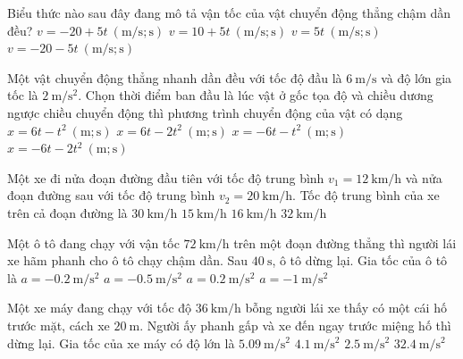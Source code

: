 \begin{ex}
	Biểu thức nào sau đây đang mô tả vận tốc của vật chuyển động thẳng chậm dần đều?
	\choice
	{\True $v=-20+5t\ \left(\si{\meter/\second}; \si{\second}\right)$}
	{$v=10+5t\ \left(\si{\meter/\second}; \si{\second}\right)$}
	{$v=5t\ \left(\si{\meter/\second}; \si{\second}\right)$}
	{$v=-20-5t\ \left(\si{\meter/\second}; \si{\second}\right)$}
	\loigiai{}
\end{ex}
\begin{ex}
	Một vật chuyển động thẳng nhanh dần đều với tốc độ đầu là $\SI{6}{\meter/\second}$ và độ lớn gia tốc là $\SI{2}{\meter/\second^2}$. Chọn thời điểm ban đầu là lúc vật ở gốc tọa độ và chiều dương ngược chiều chuyển động thì phương trình chuyển động của vật có dạng
	\choice
	{$x=6t-t^2\ \left(\si{\meter}; \si{\second}\right)$}
	{$x=6t-2t^2\ \left(\si{\meter}; \si{\second}\right)$}
	{\True $x=-6t-t^2\ \left(\si{\meter}; \si{\second}\right)$}
	{$x=-6t-2t^2\ \left(\si{\meter}; \si{\second}\right)$}
	\loigiai{}
\end{ex}
\begin{ex}
	Một xe đi nửa đoạn đường đầu tiên với tốc độ trung bình
	$v_1=\SI{12}{\kilo\meter/\hour}$ và nửa đoạn đường	sau với tốc độ trung bình $v_2=\SI{20}{\kilo\meter/\hour}$. Tốc độ trung bình của xe trên cả đoạn đường là
	\choice
	{$\SI{30}{\kilo\meter/\hour}$}
	{\True $\SI{15}{\kilo\meter/\hour}$}
	{$\SI{16}{\kilo\meter/\hour}$}
	{$\SI{32}{\kilo\meter/\hour}$}
\end{ex}
\begin{ex}
	Một ô tô đang chạy với vận tốc $\SI{72}{\kilo\meter/\hour}$ trên một đoạn đường thẳng thì người lái xe hãm phanh cho ô tô chạy chậm dần. Sau $\SI{40}{\second}$, ô tô dừng lại. Gia tốc của ô tô là
	\choice
	{$a=\SI{-0.2}{\meter/\second^2}$}
	{\True $a=\SI{-0.5}{\meter/\second^2}$}
	{$a=\SI{0.2}{\meter/\second^2}$}
	{$a=\SI{-1}{\meter/\second^2}$}
\end{ex}

\begin{ex}
	Một xe máy đang chạy với tốc độ $\SI{36}{\kilo\meter/\hour}$ bỗng người lái xe thấy có một cái hố trước mặt, cách xe $\SI{20}{\meter}$. Người ấy phanh gấp và xe đến ngay trước miệng hố thì dừng lại. Gia tốc của xe máy có độ lớn là 
	\choice
	{$\SI{5.09}{\meter/\second^2}$}
	{$\SI{4.1}{\meter/\second^2}$}
	{\True $\SI{2.5}{\meter/\second^2}$}
	{$\SI{32.4}{\meter/\second^2}$}
	\loigiai{}
\end{ex}

